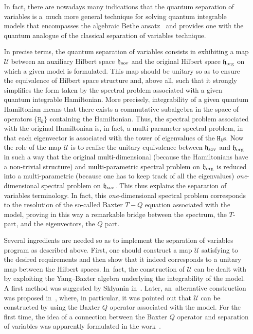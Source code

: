 \documentclass[pdftex]{sigma}%
\numberwithin{equation}{section}
\begin{document}
In fact, there are nowadays many indications that the
quantum separation of variables is a~much more general technique for solving quantum integrable models that encompasses the algebraic Bethe
ansatz~\cite{DerkachovKorchemskyManashovXXXSoVandQopNewConstEigenfctsBOp} and provides one with the quantum analogue of the classical
separation of variables technique.

In precise terms, the quantum separation of variables consists in exhibiting a map $\mathcal{U}$ bet\-ween an auxiliary Hilbert space
$\mathfrak{h}_{\rm sov}$ and the original Hilbert space $\mathfrak{h}_{\rm org}$ on which a given model is formulated. This map
should be unitary so as to ensure the equivalence of Hilbert space structure and, above all, such that it strongly simplifies the form
taken by the spectral problem associated with a given quantum integrable Hamiltonian. More precisely, integrability of a given quantum
Hamiltonian means that there exists a commutative subalgebra in the space of operators $\{\mathtt{H}_{k}\}$ containing the Hamiltonian.
Thus, the spectral problem associated with the original Hamiltonian is, in fact, a multi-parameter spectral problem, in that each
eigenvector is associated with the tower of eigenvalues of the $\mathtt{H}_{k}$s. Now the role of the map $\mathcal{U}$ is to realise the
unitary equivalence between $\mathfrak{h}_{\rm sov}$ and $\mathfrak{h}_{\rm org}$ in such a way that the original multi-dimensional
(because the Hamiltonians have a non-trivial structure) and multi-parametric spectral problem on $\mathfrak{h}_{\rm org}$ is reduced
into a multi-parametric (because one has to keep track of all the eigenvalues) \textit{one}-dimensional spectral problem on
$\mathfrak{h}_{\rm sov}$. This thus explains the separation of variables terminology. In fact, this \textit{one}-dimensional spectral
problem corresponds to the resolution of the so-called Baxter $T-Q$ equation associated with the model, proving in this way a remarkable
bridge between the spectrum, the $T$-part, and the eigenvectors, the $Q$ part.

Several ingredients are needed so as to implement the separation of variables program as described above. First, one should construct a map
$\mathcal{U}$ satisfying to the desired requirements and then show that it indeed corresponds to a unitary map between the Hilbert spaces.
In~fact, the construction of $\mathcal{U}$ can be dealt with by exploiting the Yang--Baxter algebra underlying the integrability of the
model. A first method was suggested by Sklyanin in~\cite{MR1239668}. Later, an~alternative construction was proposed in~\cite{DerkachovKorchemskyManashovXXXSoVandQopNewConstEigenfctsBOp}, where, in particular, it was pointed out that $\mathcal{U}$ can be
constructed by using the Baxter $Q$ operator associated with the model. For the first time, the idea of a connection between the Baxter $Q$
operator and separation of variables was apparently formulated in the work~\cite{Kuznetsov_1998}.
\end{document}
